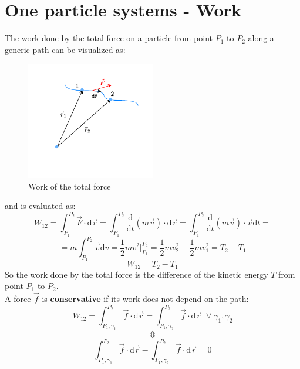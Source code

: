 \section{One particle systems - Work}
The work done by the total force on a particle from point $P_1$ to $P_2$ along a generic path can be visualized as:
\begin{figure}[!ht]
    \centering
    \includegraphics[width=0.5\textwidth]{res/svg/work.drawio}
    \caption{Work of the total force}
    \label{fig:image4}
\end{figure}
and is evaluated as:
\begin{equation}
    W_{12} = \int_{P_1}^{P_2}\vec{F}\cdot\mathrm{d}\vec{r} = \int_{P_1}^{P_2}\dfrac{\mathrm{d}}{\mathrm{d}t}(m\vec{v})\cdot\mathrm{d}\vec{r} = \int_{P_1}^{P_2}\dfrac{\mathrm{d}}{\mathrm{d}t}(m\vec{v})\cdot\vec{v}\mathrm{d}t =
\end{equation}
\begin{equation}
    = m\int_{P_1}^{P_2}\vec{v}\mathrm{d}v = \dfrac{1}{2}mv^2\bigg|_{P_1}^{P_2} = \dfrac{1}{2}mv_2^2 - \dfrac{1}{2}mv_1^2 = T_2 -T_1
\end{equation}
\begin{equation} \label{e:total_work}
    W_{12} = T_2 -T_1
\end{equation}
So the work done by the total force is the difference of the kinetic energy $T$ from point $P_1$ to $P_2$.\\
A force $\vec{f}$ is \textbf{conservative} if its work does not depend on the path:
\begin{equation}
    W_{12} = \int_{P_1,\gamma_1}^{P_2}\vec{f}\cdot\mathrm{d}\vec{r} = \int_{P_1,\gamma_2}^{P_2}\vec{f}\cdot\mathrm{d}\vec{r}\;\;\forall\;\gamma_1, \gamma_2
\end{equation}
\[\Updownarrow \]
\begin{equation}
    \int_{P_1,\gamma_1}^{P_2}\vec{f}\cdot\mathrm{d}\vec{r} - \int_{P_1,\gamma_2}^{P_2}\vec{f}\cdot\mathrm{d}\vec{r} = 0
\end{equation}
